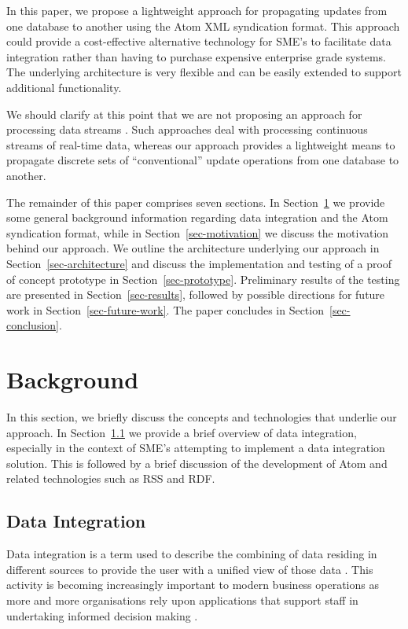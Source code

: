 \documentclass{CRPITStyle}
\begin{document}
In this paper, we propose a lightweight approach for propagating updates
from one database to another using the Atom XML syndication format. This
approach could provide a cost-effective alternative technology for SME's
to facilitate data integration rather than having to purchase expensive
enterprise grade systems. The underlying architecture is very flexible
and can be easily extended to support additional functionality.

We should clarify at this point that we are not proposing an approach
for processing data streams \cite{Babc-B-2002-Streams}. Such approaches
deal with processing continuous streams of real-time data, whereas our
approach provides a lightweight means to propagate discrete sets of
``conventional'' update operations from one database to another.

The remainder of this paper comprises seven sections. In
Section~\ref{sec-background} we provide some general background
information regarding data integration and the Atom syndication format,
while in Section~\ref{sec-motivation} we discuss the motivation behind
our approach. We outline the architecture underlying our approach in
Section~\ref{sec-architecture} and discuss the implementation and
testing of a proof of concept prototype in Section~\ref{sec-prototype}.
Preliminary results of the testing are presented in
Section~\ref{sec-results}, followed by possible directions for future
work in Section~\ref{sec-future-work}. The paper concludes in
Section~\ref{sec-conclusion}.


\section{Background}
\label{sec-background}

In this section, we briefly discuss the concepts and technologies that
underlie our approach. In Section~\ref{sec-data-integration} we provide
a brief overview of data integration, especially in the context of SME's
attempting to implement a data integration solution. This is followed by
a brief discussion of the development of Atom and related technologies
such as RSS and RDF.


\subsection{Data Integration}
\label{sec-data-integration}

Data integration is a term used to describe the combining of data
residing in different sources to provide the user with a unified view of
those data \cite{Bati-C-1986,Yu-C-2004-SIGMOD}. This activity is
becoming increasingly important to modern business operations as more
and more organisations rely upon applications that support staff in
undertaking informed decision making
\cite{Calv-D-1998-CoopIS,Yu-C-2004-SIGMOD}.
\end{document}
